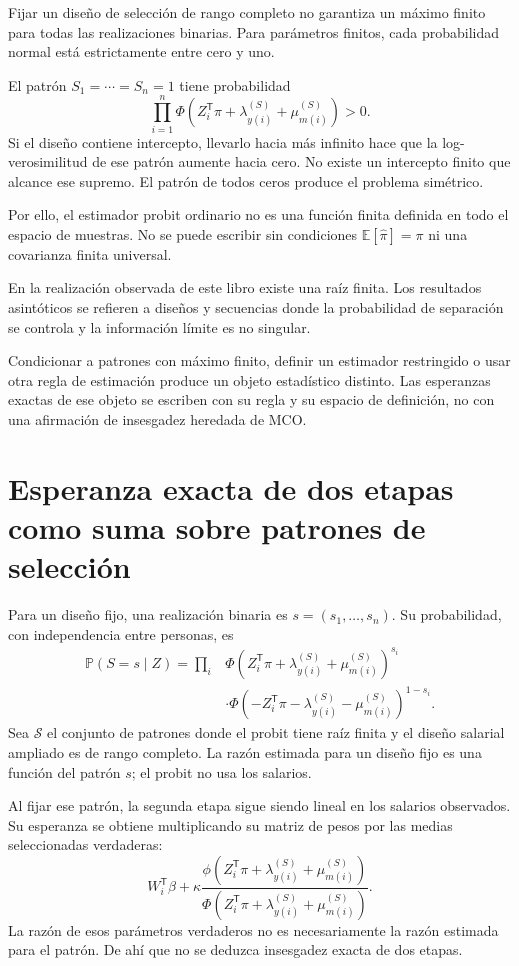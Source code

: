 \documentclass[11pt,a4paper]{article}
\newcommand{\E}{\mathbb E}
\newcommand{\Prob}{\mathbb P}
\begin{document}
Fijar un diseño de selección de rango completo no garantiza un máximo finito para todas las realizaciones binarias. Para parámetros finitos, cada probabilidad normal está estrictamente entre cero y uno.

El patrón $S_1=\cdots=S_n=1$ tiene probabilidad
\[
\prod_{i=1}^n\Phi(Z_i^{\mathsf T}\pi+\lambda_{y(i)}^{(S)}+\mu_{m(i)}^{(S)})>0.
\]
Si el diseño contiene intercepto, llevarlo hacia más infinito hace que la log-verosimilitud de ese patrón aumente hacia cero. No existe un intercepto finito que alcance ese supremo. El patrón de todos ceros produce el problema simétrico.

Por ello, el estimador probit ordinario no es una función finita definida en todo el espacio de muestras. No se puede escribir sin condiciones
$\E[\widehat\pi]=\pi$ ni una covarianza finita universal.

En la realización observada de este libro existe una raíz finita. Los resultados asintóticos se refieren a diseños y secuencias donde la probabilidad de separación se controla y la información límite es no singular.

Condicionar a patrones con máximo finito, definir un estimador restringido o usar otra regla de estimación produce un objeto estadístico distinto. Las esperanzas exactas de ese objeto se escriben con su regla y su espacio de definición, no con una afirmación de insesgadez heredada de MCO.

\clearpage
\section{Esperanza exacta de dos etapas como suma sobre patrones de selección}

Para un diseño fijo, una realización binaria es $s=(s_1,\ldots,s_n)$. Su probabilidad, con independencia entre personas, es
\[
\begin{aligned}
\Prob(S=s\mid Z)
=\prod_i&
\Phi(Z_i^{\mathsf T}\pi+\lambda_{y(i)}^{(S)}+\mu_{m(i)}^{(S)})^{s_i}\\
&\cdot\Phi(-Z_i^{\mathsf T}\pi-\lambda_{y(i)}^{(S)}-\mu_{m(i)}^{(S)})^{1-s_i}.
\end{aligned}
\]
Sea $\mathcal S$ el conjunto de patrones donde el probit tiene raíz finita y el diseño salarial ampliado es de rango completo. La razón estimada para un diseño fijo es una función del patrón $s$; el probit no usa los salarios.

Al fijar ese patrón, la segunda etapa sigue siendo lineal en los salarios observados. Su esperanza se obtiene multiplicando su matriz de pesos por las medias seleccionadas verdaderas:
\[
W_i^{\mathsf T}\beta+
\kappa\frac{\phi(Z_i^{\mathsf T}\pi+\lambda_{y(i)}^{(S)}+\mu_{m(i)}^{(S)})}
{\Phi(Z_i^{\mathsf T}\pi+\lambda_{y(i)}^{(S)}+\mu_{m(i)}^{(S)})}.
\]
La razón de esos parámetros verdaderos no es necesariamente la razón estimada para el patrón. De ahí que no se deduzca insesgadez exacta de dos etapas.
\end{document}
